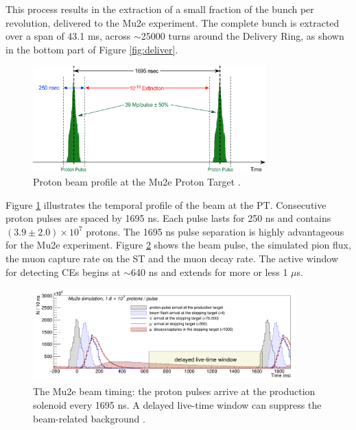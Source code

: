 This process results in the extraction of a small fraction of the bunch per revolution, 
delivered to the Mu2e experiment. The complete bunch is extracted over a span of 43.1 ms, 
across $\sim$25000 turns around the Delivery Ring, as shown in the bottom part of Figure \ref{fig:deliver}.
\begin{figure}[!h]
\centering
\includegraphics[width =0.8\textwidth]{figures/png/Screenshot_20240301_151148.png}
\caption[Proton beam profile.]{Proton beam profile at the Mu2e Proton Target \cite{accelerator}.}
\label{fig:beamprofile}
\end{figure}
Figure \ref{fig:beamprofile} illustrates the temporal 
profile of the beam at the PT. Consecutive 
proton pulses are spaced by 1695 ns. Each pulse lasts for 
250 ns and contains $(3.9 \pm 2.0 )\times 10^7$ protons. 
The 1695 ns pulse separation is highly advantageous for 
the Mu2e experiment. Figure \ref{fig:beamwindow} shows the beam pulse, 
the simulated pion flux, the muon capture rate on the ST 
and the muon decay rate. The active window for detecting 
CEs begins at $\sim$640 ns and extends for more or less 1 
$\mu$s. 


\begin{figure}[!h]
\centering
\includegraphics[width =0.9\textwidth]{figures/png/Screenshot_20240301_164649.png}
\caption[The Mu2e beam timing]{The Mu2e beam timing: the proton pulses arrive at the production solenoid every 1695 ns. A delayed live-time window can suppress the beam-related background \cite{universe9010054}.}
\label{fig:beamwindow}
\end{figure}
